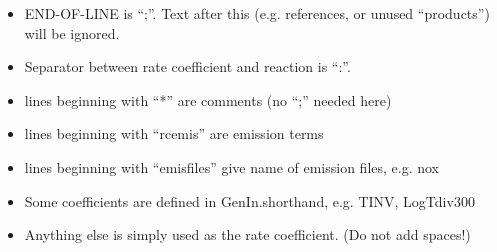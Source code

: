 \documentclass[a4paper,10pt,english]{sphinxmanual}
\begin{document}
\begin{sphinxVerbatim}[commandchars=\\\{\}]
   
                       
              
                           

                            
\end{sphinxVerbatim}
\begin{itemize}
\item {} 
END-OF-LINE is “;”. Text after this (e.g. references, or unused “products”) will be ignored.

\item {} 
Separator between rate coefficient and reaction is “:”.

\item {} 
lines beginning with “*” are comments (no “;” needed here)

\item {} 
lines beginning with “rcemis” are emission terms

\item {} 
lines beginning with “emisfiles” give name of  emission files, e.g. nox

\item {} 
Some coefficients are defined in GenIn.shorthand, e.g. TINV, LogTdiv300

\item {} 
Anything else is simply used as the rate coefficient. (Do not add spaces!)

\end{itemize}
\end{document}
